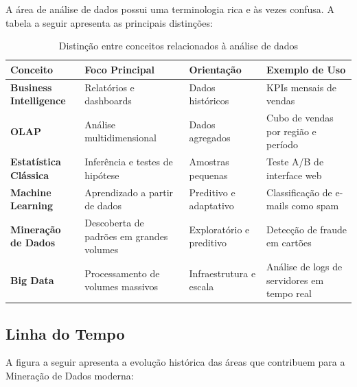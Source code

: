 \documentclass[12pt,a4paper]{article}
\begin{document}
A área de análise de dados possui uma terminologia rica e às vezes confusa. A tabela a seguir apresenta as principais distinções:

\begin{table}[ht]
\centering
\caption{Distinção entre conceitos relacionados à análise de dados}
\label{tab:distincoes}
\begin{tabular}{>{\bfseries}p{3.0cm} p{3.5cm} p{3.5cm} p{4.0cm}}
\toprule
\textbf{Conceito} & \textbf{Foco Principal} & \textbf{Orientação} & \textbf{Exemplo de Uso} \\
\midrule
Business Intelligence & Relatórios e dashboards & Dados históricos & KPIs mensais de vendas \\
\midrule
OLAP & Análise multidimensional & Dados agregados & Cubo de vendas por região e período \\
\midrule
Estatística Clássica & Inferência e testes de hipótese & Amostras pequenas & Teste A/B de interface web \\
\midrule
Machine Learning & Aprendizado a partir de dados & Preditivo e adaptativo & Classificação de e-mails como spam \\
\midrule
Mineração de Dados & Descoberta de padrões em grandes volumes & Exploratório e preditivo & Detecção de fraude em cartões \\
\midrule
Big Data & Processamento de volumes massivos & Infraestrutura e escala & Análise de logs de servidores em tempo real \\
\bottomrule
\end{tabular}
\end{table}

\subsection{Linha do Tempo}

A figura a seguir apresenta a evolução histórica das áreas que contribuem para a Mineração de Dados moderna:
\end{document}
